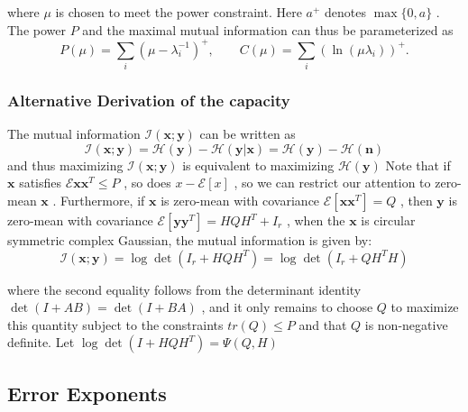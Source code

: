 \documentclass[10pt,a4paper,UTF8]{article}
\begin{document}
where \(\mu\) is chosen to meet the power constraint. Here \(a^+\) denotes \(\max\{0,a\}\) . The power \(P\) and the maximal mutual information can thus be parameterized as
\begin{equation}
  \label{eq:20120323pmucmu}
  P(\mu) =\sum_{i} (\mu - \lambda_{i}^{-1})^+, \qquad C(\mu) =\sum_{i} (\ln (\mu\lambda_i))^+.
\end{equation}
\subsubsection{Alternative Derivation of the capacity} 
The mutual information \(\mathcal{I}(\mathbf{x};\mathbf{y})\) can be written as 
\begin{equation}
  \label{eq:20120323Ixy}
  \mathcal{I}(\mathbf{x};\mathbf{y}) = \mathcal{H}(\mathbf{y}) - \mathcal{H}(\mathbf{y}| \mathbf{x}) = \mathcal{H}(\mathbf{y}) - \mathcal{H}(\mathbf{n})
\end{equation}
and thus maximizing \(\mathcal{I}(\mathbf{x};\mathbf{y})\) is equivalent to maximizing \(\mathcal{H}(\mathbf{y})\) Note that if \(\mathbf{x}\) satisfies \(\mathcal{E}{\mathbf{x}\mathbf{x}^T}  \le P\) , so does \(x-\mathcal{E}[x]\) , so we can restrict our attention to zero-mean \(\mathbf{x}\) . Furthermore, if \(\mathbf{x}\) is zero-mean with covariance \(\mathcal{E}[\mathbf{x}\mathbf{x}^T] = Q\) , then \(\mathbf{y}\) is zero-mean with covariance \(\mathcal{E}[\mathbf{y}\mathbf{y}^T] = HQH^T + I_r\) , when the \(\mathbf{x}\) is circular symmetric complex Gaussian, the mutual information is given by:
\begin{equation}
  \label{eq:20120323Ixy2}
  \mathcal{I}(\mathbf{x};\mathbf{y}) = \log\det(I_r + HQH^T)= \log\det(I_r + QH^{T}H)
\end{equation}

where the second equality follows from the determinant identity \(\det(I+AB) = \det(I+BA)\) , and it only remains to choose \(Q\) to maximize this quantity subject to the constraints \(tr(Q)\le P\) and that \(Q\) is non-negative definite. Let \(\log\det(I+ HQH^{T})= \Psi(Q,H)\)
\subsection{Error Exponents}
\label{sec:org622ed69}
\end{document}
